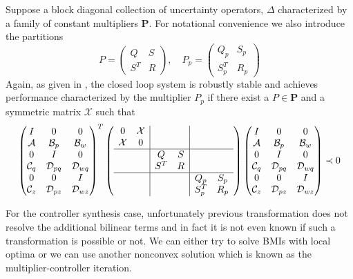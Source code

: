 Suppose a block diagonal collection of uncertainty operators, $\Delta$ characterized by a family of constant multipliers $\mathbf{P}$. 
For notational convenience we also introduce the partitions 
\[
P=\begin{pmatrix}Q&S\\ S^T&R\end{pmatrix},\quad P_p=\begin{pmatrix}Q_p&S_p\\ S^T_p&R_p\end{pmatrix}
\]
Again, as given in , the closed loop system is robustly stable and achieves performance characterized by the multiplier 
$P_p$ if there exist a $P\in\mathbf{P}$ and a symmetric matrix $\mathcal{X}$ such that 
\begin{equation}
\begin{pmatrix}
I&0&0\\\mathcal{A}&\mathcal{B}_p&\mathcal{B}_w\\
0&I&0\\\mathcal{C}_q&\mathcal{D}_{pq}&\mathcal{D}_{wq}\\
0&0&I\\\mathcal{C}_z&\mathcal{D}_{pz}&\mathcal{D}_{wz}
\end{pmatrix}^T
\left(
\begin{array}{cc|cc|cc}
	0&\mathcal{X}&&&&\\
	\mathcal{X}&0&&&&\\\hline
	&&Q&S&&\\
	&&S^T&R&&\\\hline
	&&&&Q_p&S_p\\
	&&&&S_p^T&R_p\\
\end{array}
\right)
\begin{pmatrix}
I&0&0\\\mathcal{A}&\mathcal{B}_p&\mathcal{B}_w\\
0&I&0\\\mathcal{C}_q&\mathcal{D}_{pq}&\mathcal{D}_{wq}\\
0&0&I\\\mathcal{C}_z&\mathcal{D}_{pz}&\mathcal{D}_{wz}
\end{pmatrix}\prec 0
\label{eq:analysisLMI}
\end{equation}

%
%

For the controller synthesis case, unfortunately previous transformation does not resolve the additional bilinear terms and in fact it is not even known 
if such a transformation is possible or not. We can either try to solve BMIs with local optima or we can use another nonconvex solution which is known as 
the multiplier-controller iteration. 

